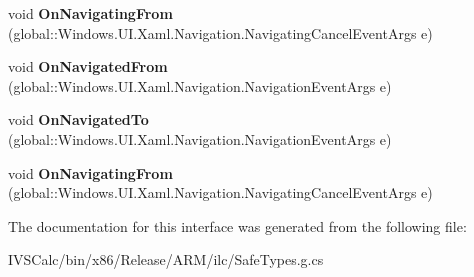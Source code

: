 \begin{DoxyCompactItemize}
void {\bfseries On\+Navigating\+From} (global\+::\+Windows.\+U\+I.\+Xaml.\+Navigation.\+Navigating\+Cancel\+Event\+Args e)
\item 
\mbox{\label{interface_windows_1_1_u_i_1_1_xaml_1_1_controls_1_1_i_page_overrides_af0d15cae1c922566df43dad9237d536c}} 
void {\bfseries On\+Navigated\+From} (global\+::\+Windows.\+U\+I.\+Xaml.\+Navigation.\+Navigation\+Event\+Args e)
\item 
\mbox{\label{interface_windows_1_1_u_i_1_1_xaml_1_1_controls_1_1_i_page_overrides_a1b9b037b805024dc22a6292f5fac582e}} 
void {\bfseries On\+Navigated\+To} (global\+::\+Windows.\+U\+I.\+Xaml.\+Navigation.\+Navigation\+Event\+Args e)
\item 
\mbox{\label{interface_windows_1_1_u_i_1_1_xaml_1_1_controls_1_1_i_page_overrides_aa9a09a623757d484b26c44e93160e131}} 
void {\bfseries On\+Navigating\+From} (global\+::\+Windows.\+U\+I.\+Xaml.\+Navigation.\+Navigating\+Cancel\+Event\+Args e)
\end{DoxyCompactItemize}


The documentation for this interface was generated from the following file\+:\begin{DoxyCompactItemize}
\item 
I\+V\+S\+Calc/bin/x86/\+Release/\+A\+R\+M/ilc/Safe\+Types.\+g.\+cs\end{DoxyCompactItemize}
